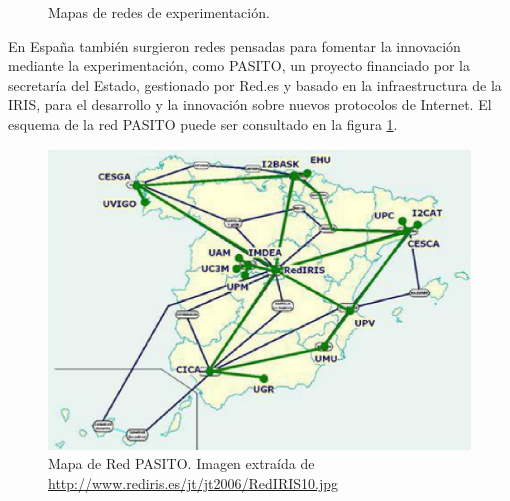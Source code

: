 \documentclass[a4paper,11pt]{book}
\begin{document}
\begin{figure}[tb]
\centering
\hspace*{-0.85cm}
\caption{Mapas de redes de experimentación.}
\end{figure}

En España también surgieron redes pensadas para fomentar la innovación mediante la experimentación, como \ac{PASITO}, un proyecto financiado por la secretaría del Estado, gestionado por Red.es y basado en la infraestructura de la \ac{IRIS}, para el desarrollo y la innovación sobre nuevos protocolos de Internet. El esquema de la red \ac{PASITO} puede ser consultado en la figura \ref{iris}.

\begin{figure}[tb]
\centering
\includegraphics[scale=0.65]{./figuras/iris}
\caption[Mapa de Red PASITO]{Mapa de Red PASITO. Imagen extraída de \url{http://www.rediris.es/jt/jt2006/RedIRIS10.jpg}}\label{iris}
\end{figure}
\end{document}
